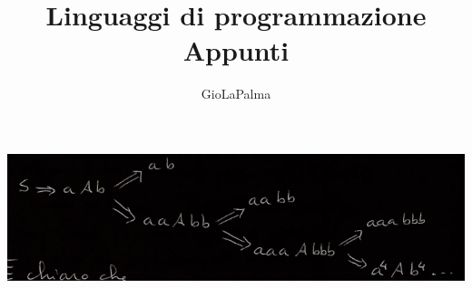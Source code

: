 \documentclass{report}
\title{\Huge{Linguaggi di programmazione}\\Appunti}
\author{\huge{GioLaPalma}}
\date{}
\begin{document}
\maketitle
\newpage%

\tableofcontents

\pagebreak
\includegraphics{alberello_1.png}





\end{document}
